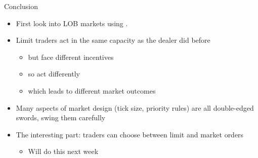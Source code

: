 \documentclass[english,10pt]{beamer}
\begin{document}


\begin{frame}{Conclusion}
	\begin{itemize}
		\item First look into LOB markets using \cite{glosten_is_1994}.
		\item Limit traders act in the same capacity as the dealer did before
		\begin{itemize}
			\item but face different incentives
			\item so act differently
			\item which leads to different market outcomes
		\end{itemize}
		\item Many aspects of market design (tick size, priority rules) are all double-edged swords, swing them carefully
		\item The interesting part: traders can choose between limit and market orders
		\begin{itemize}
			\item Will do this next week
		\end{itemize}
	\end{itemize}
\end{frame}
\end{document}
